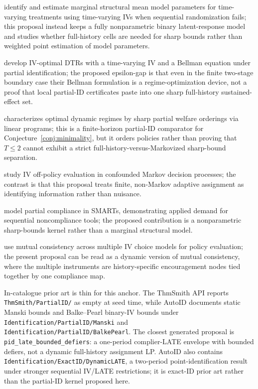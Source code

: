 \documentclass[11pt]{article}
\theoremstyle{definition}
\theoremstyle{plain}
\theoremstyle{remark}
\begin{document}
\citet{MichaelCuiLorchTchetgen2024} identify and estimate marginal structural mean model parameters for time-varying treatments using time-varying IVs when sequential randomization fails; this proposal instead keeps a fully nonparametric binary latent-response model and studies whether full-history cells are needed for sharp bounds rather than weighted point estimation of model parameters.

\citet{ChenZhang2023} develop IV-optimal DTRs with a time-varying IV and a Bellman equation under partial identification; the proposed epsilon-gap is that even in the finite two-stage boundary case their Bellman formulation is a regime-optimization device, not a proof that local partial-ID certificates paste into one sharp full-history sustained-effect set.

\citet{Han2024} characterizes optimal dynamic regimes by sharp partial welfare orderings via linear programs; this is a finite-horizon partial-ID comparator for Conjecture~\ref{conj:minimality}, but it orders policies rather than proving that \(T\le2\) cannot exhibit a strict full-history-versus-Markovized sharp-bound separation.

\citet{XuZhuShiLuoSong2023} study IV off-policy evaluation in confounded Markov decision processes; the contrast is that this proposal treats finite, non-Markov adaptive assignment as identifying information rather than nuisance.

\citet{ArtmanBhattacharyaErtefaieLynchMcKayJohnson2024} model partial compliance in SMARTs, demonstrating applied demand for sequential noncompliance tools; the proposed contribution is a nonparametric sharp-bounds kernel rather than a marginal structural model.

\citet{MogstadTorgovitskyWalters2024} use mutual consistency across multiple IV choice models for policy evaluation; the present proposal can be read as a dynamic version of mutual consistency, where the multiple instruments are history-specific encouragement nodes tied together by one compliance map.

In-catalogue prior art is thin for this anchor.  The ThmSmith API reports \texttt{ThmSmith/PartialID/} as empty at seed time, while AutoID documents static Manski bounds and Balke--Pearl binary-IV bounds under \texttt{Identification/PartialID/Manski} and \texttt{Identification/PartialID/BalkePearl}.  The closest generated proposal is \texttt{pid\_late\_bounded\_defiers}: a one-period complier-LATE envelope with bounded defiers, not a dynamic full-history assignment LP.  AutoID also contains \texttt{Identification/ExactID/DynamicLATE}, a two-period point-identification result under stronger sequential IV/LATE restrictions; it is exact-ID prior art rather than the partial-ID kernel proposed here.
\end{document}
